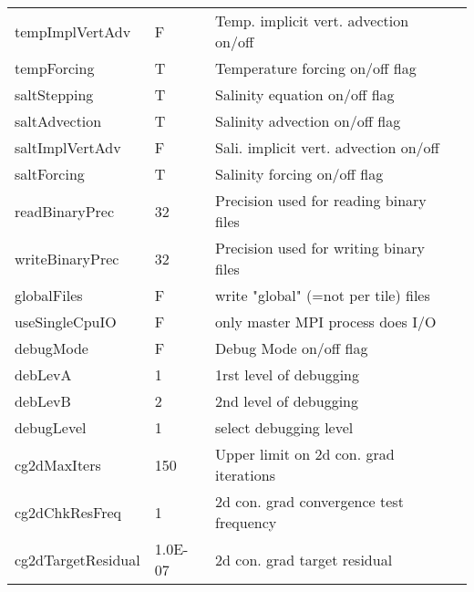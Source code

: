 \begin{table}
\begin{tabular}{lllc}
    \\
   tempImplVertAdv   &                     F
    &   Temp. implicit vert. advection on/off 
    &  %
    \\
   tempForcing    &                     T
    &   Temperature forcing on/off flag 
    &  %
    \\
   saltStepping   &                     T
    &   Salinity equation on/off flag 
    &  %
    \\
   saltAdvection  &                     T
    &   Salinity advection on/off flag 
    &  %
    \\
   saltImplVertAdv   &                     F
    &   Sali. implicit vert. advection on/off 
    &  %
    \\
   saltForcing    &                     T
    &   Salinity forcing on/off flag 
    &  %
    \\
    readBinaryPrec   &                        32
    &   Precision used for reading binary files 
    &  %
    \\
   writeBinaryPrec   &                        32
    &   Precision used for writing binary files 
    &  %
    \\
    globalFiles   &                     F
    &   write "global" (=not per tile) files 
    &  %
    \\
    useSingleCpuIO   &                     F
    &   only master MPI process does I/O 
    &  %
    \\
    debugMode    &                     F
    &   Debug Mode on/off flag 
    &  %
    \\
      debLevA    &                         1
    &   1rst level of debugging 
    &  %
    \\
      debLevB    &                         2
    &   2nd  level of debugging 
    &  %
    \\
    debugLevel   &                         1
    &   select debugging level 
    &  %
    \\
   cg2dMaxIters   &                       150
    &   Upper limit on 2d con. grad iterations  
    &  %
    \\
   cg2dChkResFreq   &                         1
    &   2d con. grad convergence test frequency 
    &  %
    \\
   cg2dTargetResidual   &                   1.0E-07
    &   2d con. grad target residual  
    &  %
    \\

\end{tabular}
\end{table}
